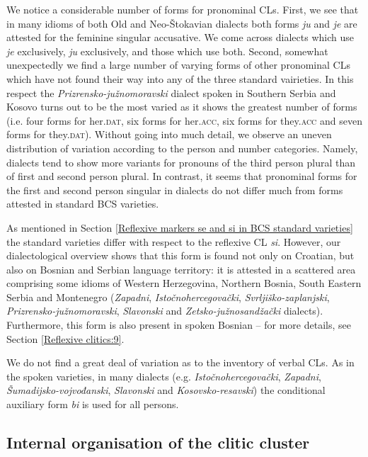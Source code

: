 We notice a considerable number of forms for pronominal CLs. First, we see that in many idioms of both Old and Neo-Štokavian dialects both forms \textit{ju} and \textit{je} are attested for the feminine singular accusative. We come across dialects which use \textit{je} exclusively, \textit{ju} exclusively, and those which use both. Second, somewhat unexpectedly we find a large number of varying forms of other pronominal CLs which have not found their way into any of the three standard vairieties. In this respect the \textit{Prizrensko-južnomoravski} dialect spoken in Southern Serbia and Kosovo turns out to be the most varied as it shows the greatest number of forms (i.e. four forms for her.\textsc{dat}, six forms for her.\textsc{acc}, six forms for they.\textsc{acc} and seven forms for they.\textsc{dat}). Without going into much detail, we observe an uneven distribution of variation according to the person and number categories. Namely, dialects tend to show more variants for pronouns of the third person plural than of first and second person plural. In contrast, it seems that pronominal forms for the first and second person singular in dialects do not differ much from forms attested in standard BCS varieties.

As mentioned in Section \ref{Reflexive markers se and si in BCS standard varieties} the standard varieties differ with respect to the reflexive CL \textit{si}. However, our dialectological overview shows that this form is found not only on Croatian, but also on Bosnian and Serbian language territory: it is attested in a scattered area comprising some idioms of Western Herzegovina, Northern Bosnia, South Eastern Serbia and Montenegro (\textit{Zapadni}, \textit{Istočnohercegovački}, \textit{Svrljiško-zaplanjski}, \textit{Prizrensko-južnomoravski}, \textit{Slavonski} and \textit{Zetsko-južnosandžački} dialects). Furthermore, this form is also present in spoken Bosnian – for more details, see Section \ref{Reflexive clitics:9}.

We do not find a great deal of variation as to the inventory of verbal CLs. As in the spoken varieties, in many dialects (e.g. \textit{Istočnohercegovački}, \textit{Zapadni}, \textit{Šumadijsko-vojvođanski}, \textit{Slavonski} and \textit{Kosovsko-resavski}) the conditional auxiliary form \textit{bi} is used for all persons.

\subsection{Internal organisation of the clitic cluster}

